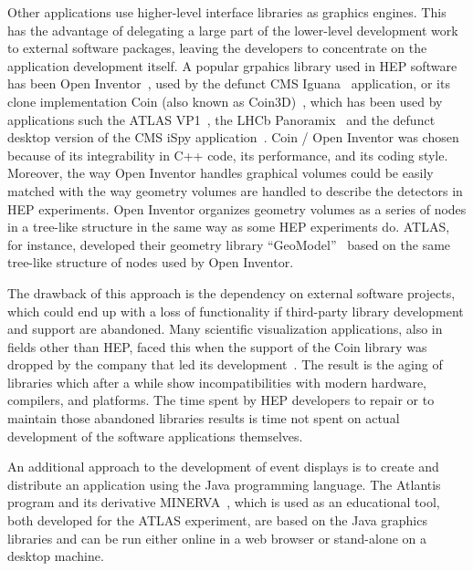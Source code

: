 \documentclass[12pt,a4paper]{article}
\begin{document}

Other applications use higher-level interface libraries as graphics engines. This has the advantage of delegating
a large part of the lower-level development work to external software packages, leaving the developers to concentrate
on the application development itself. A popular grpahics library used in HEP software has been
Open Inventor~\cite{OpenInventor1993}, used by the defunct CMS Iguana~\cite{CMSIguanaPaperNIM,CMSIguana} application, or
its clone implementation Coin (also known as Coin3D)~\cite{Coin3D}, which has been used by applications such
the ATLAS VP1~\cite{ATLASVP12010}, the LHCb Panoramix~\cite{LHCbPanoramix} and the defunct desktop version of the
CMS iSpy application~\cite{CMSISpy}. Coin / Open Inventor was
chosen because of its integrability in C++ code, its performance, and its coding style. Moreover, the way Open Inventor handles
graphical volumes could be easily matched with the way geometry volumes are handled to describe the detectors in HEP experiments.
Open Inventor organizes geometry volumes as a series of nodes in a tree-like structure in the same way as some
HEP experiments do. ATLAS, for instance, developed their geometry library “GeoModel”~\cite{ATLASGeoModel2004} based on
the same tree-like structure of nodes used by Open Inventor.

The drawback of this approach is the dependency on external software projects, which could end up with a loss of functionality if
third-party library development and support are abandoned. Many scientific visualization applications, also in fields other than
HEP, faced this when the support of the Coin library was dropped by the company that led its development~\cite{CoinEndOfLifeLetter}.
The result is the aging of libraries which after a while show incompatibilities with modern hardware, compilers, and platforms. The time
spent by HEP developers to repair or to maintain those abandoned libraries results is time not spent on actual development
of the software applications themselves.

An additional approach to the development of event displays is to create and distribute an application using the Java programming language.
The Atlantis~\cite{ATLASAtlantis} program and its derivative MINERVA~\cite{ATLASMinerva}, which is used as an educational tool,
both developed for the ATLAS experiment, are based on the Java graphics libraries and can be run either online in a web browser
or stand-alone on a desktop machine.
\end{document}
